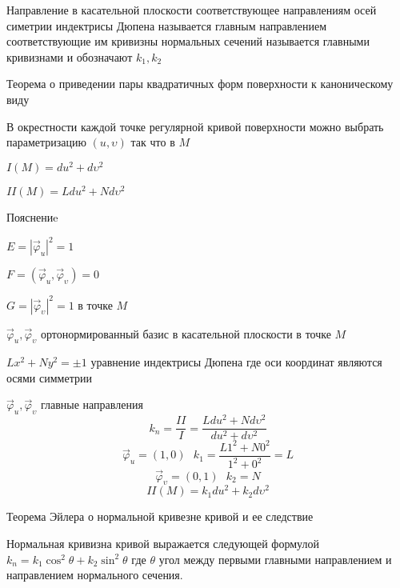 \begin{define}
  Направление в касательной плоскости соответствующее направлениям осей симетрии
  индектрисы Дюпена называется главным направлением соответствующие им кривизны
  нормальных сечений называется главными кривизнами и обозначают $k_1, k_2$
\end{define}

\begin{title}[\Large]
  Теорема о приведении пары квадратичных форм поверхности к каноническому виду
\end{title}

\begin{theorem}
  В окрестности каждой точке регулярной кривой поверхности можно выбрать
  параметризацию $(u, \upsilon)$ так что в $M$

  $I(M) = du^2 + d\upsilon^2$

  $II(M) = Ldu^2 + Nd\upsilon^2$

  Пояснениe

  $E = |\vec \varphi_u|^2 = 1$

  $F = (\vec \varphi_u, \vec \varphi_{\upsilon}) = 0$

  $G = |\vec \varphi_{\upsilon}|^2 = 1$ в точке $M$

  $\vec \varphi_u, \vec \varphi_{\upsilon}$ ортонормированный базис в
  касательной плоскости в точке $M$

  $Lx^2 + Ny^2 = \pm 1$ уравнение индектрисы Дюпена где оси координат являются
  осями симметрии

  $\vec \varphi_u, \vec \varphi_{\upsilon}$ главные направления
  $$
  k_n = \frac{II}{I} = \frac{Ldu^2 + Nd\upsilon^2}{du^2 + d\upsilon^2}
  $$
  $$
  \vec \varphi_u = (1,0) ~~~ k_1 = \frac{L 1^2 + N 0^2}{1^2 + 0^2} = L
  $$
  $$
  \vec \varphi_{\upsilon} = (0,1) ~~~ k_2 = N
  $$
  $$
  II(M) = k_1 du^2 + k_2 d\upsilon^2
  $$
\end{theorem}

\begin{title}[\Large]
  Теорема Эйлера о нормальной кривезне кривой и ее следствие
\end{title}

\begin{theorem}[Эйлера]
  Нормальная кривизна кривой выражается следующей формулой
  $k_n = k_1 \cos^2 \theta + k_2 \sin^2 \theta$ где $\theta$ угол между первыми
  главными направлением и направлением  нормального сечения.
\end{theorem}

